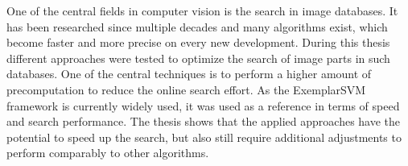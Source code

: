 One of the central fields in computer vision is the search in image databases. It has been researched since multiple decades and many algorithms exist, which become faster and more precise on every new development. During this thesis different approaches were tested to optimize the search of image parts in such databases. One of the central techniques is to perform a higher amount of precomputation to reduce the online search effort. As the ExemplarSVM framework \cite{Malisiewicz2011} is currently widely used, it was used as a reference in terms of speed and search performance. The thesis shows that the applied approaches have the potential to speed up the search, but also still require additional adjustments to perform comparably to other algorithms.
